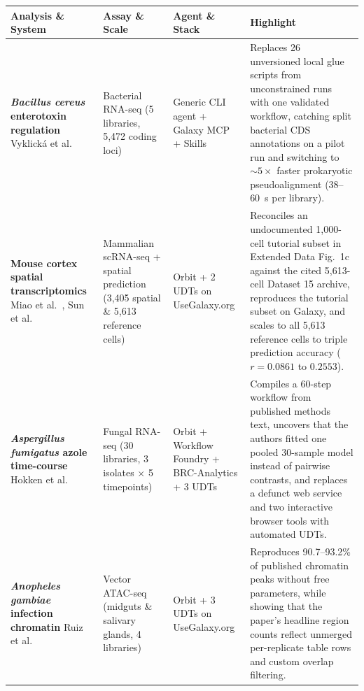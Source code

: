 \documentclass[11pt,letterpaper]{article}
\begin{document}
\begin{table}[!htbp]
\centering
\scriptsize
\setlength{\tabcolsep}{4.5pt}
\renewcommand{\arraystretch}{1.18}
\begin{tabularx}{\textwidth}{p{2.9cm}p{2.3cm}p{2.3cm}X}
\toprule
\textbf{Analysis \& System} & \textbf{Assay \& Scale} & \textbf{Agent \& Stack} & \textbf{Highlight} \\
\midrule
\textbf{\textit{Bacillus cereus} enterotoxin regulation} \newline Vyklick{\'a} et al.\ \cite{vyklicka2026} & Bacterial RNA-seq \newline (5 libraries, 5,472 coding loci) & Generic CLI agent + Galaxy MCP + Skills & Replaces 26 unversioned local glue scripts from unconstrained runs with one validated workflow, catching split bacterial CDS annotations on a pilot run and switching to $\sim 5\times$ faster prokaryotic pseudoalignment (38--60~s per library). \\
\addlinespace[0.35em]
\textbf{Mouse cortex spatial transcriptomics} \newline Miao et al.\ \cite{miao2026}, Sun et al.\ \cite{sun2024} & Mammalian scRNA-seq + spatial prediction \newline (3,405 spatial \& 5,613 reference cells) & Orbit + 2 UDTs on UseGalaxy.org & Reconciles an undocumented 1,000-cell tutorial subset in Extended Data Fig.\ 1c against the cited 5,613-cell Dataset 15 archive, reproduces the tutorial subset on Galaxy, and scales to all 5,613 reference cells to triple prediction accuracy ($r = 0.0861$ to $0.2553$). \\
\addlinespace[0.35em]
\textbf{\textit{Aspergillus fumigatus} azole time-course} \newline Hokken et al.\ \cite{hokken2018} & Fungal RNA-seq \newline (30 libraries, 3 isolates $\times$ 5 timepoints) & Orbit + Workflow Foundry + BRC-Analytics + 3 UDTs & Compiles a 60-step workflow from published methods text, uncovers that the authors fitted one pooled 30-sample model instead of pairwise contrasts, and replaces a defunct web service and two interactive browser tools with automated UDTs. \\
\addlinespace[0.35em]
\textbf{\textit{Anopheles gambiae} infection chromatin} \newline Ruiz et al.\ \cite{ruiz2021} & Vector ATAC-seq \newline (midguts \& salivary glands, 4 libraries) & Orbit + 3 UDTs on UseGalaxy.org & Reproduces 90.7--93.2\% of published chromatin peaks without free parameters, while showing that the paper's headline region counts reflect unmerged per-replicate table rows and custom overlap filtering. \\

\end{tabularx}
\end{table}
\end{document}
